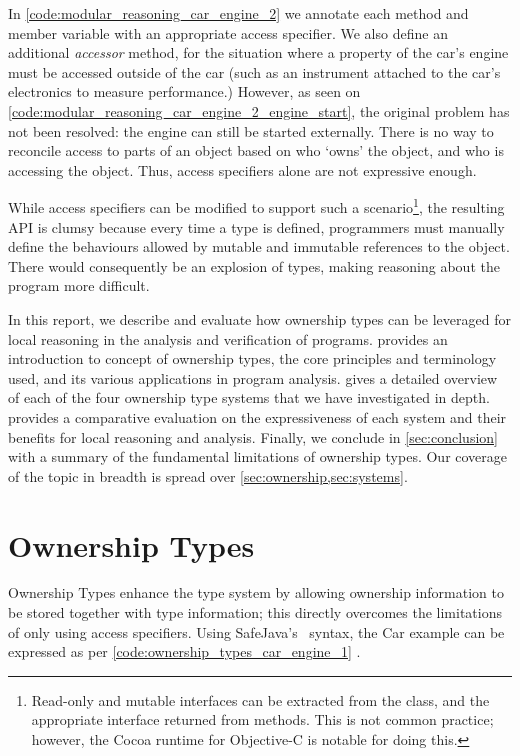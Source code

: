 \documentclass{acm_proc_article-sp}
\begin{document}
In \cref{code:modular_reasoning_car_engine_2} we annotate each method
and member variable with an appropriate access specifier. We also define an
additional \emph{accessor} method, for the situation where a property of the
car's engine must be accessed outside of the car (such as an instrument
attached to the car's electronics to measure performance.) However, as seen on
\cref{code:modular_reasoning_car_engine_2_engine_start}, the original
problem has not been resolved: the engine can still be started externally.
There is no way to reconcile access to parts of an object based on who `owns'
the object, and who is accessing the object. Thus, access specifiers alone are
not expressive enough.

While access specifiers can be modified to support such a
scenario\footnote{Read-only and mutable interfaces can be extracted from the
class, and the appropriate interface returned from methods. This is not common
practice; however, the Cocoa runtime for Objective-C is notable for doing
this.}, the resulting API is clumsy because every time a type is defined,
programmers must manually define the behaviours allowed by mutable and
immutable references to the object. There would consequently be an explosion of
types, making reasoning about the program more difficult.

In this report, we describe and evaluate how ownership types can be leveraged
for local reasoning in the analysis and verification of programs.
 provides an introduction to concept of ownership types,
the core principles and terminology used, and its various applications in
program analysis.  gives a detailed overview of each of the
four ownership type systems that we have investigated in depth. 
provides a comparative evaluation on the expressiveness of each system and
their benefits for local reasoning and analysis. Finally, we conclude in
\cref{sec:conclusion} with a summary of the fundamental limitations of
ownership types. Our coverage of the topic in breadth is spread over
\cref{sec:ownership,sec:systems}.


\section{Ownership Types}
\label{sec:ownership}

Ownership Types enhance the type system by allowing ownership information to be
stored together with type information; this directly overcomes the limitations
of only using access specifiers. Using SafeJava's~\cite{boyapati04safejava}
syntax, the Car example can be expressed as per
\cref{code:ownership_types_car_engine_1}
.
\end{document}
